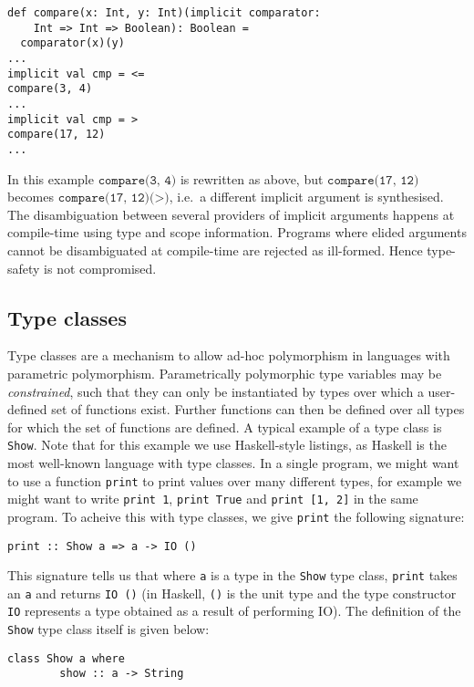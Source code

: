 \begin{minipage}{\linewidth}
\begin{lstlisting}[mathescape]
def compare(x: Int, y: Int)(implicit comparator:
    Int => Int => Boolean): Boolean =
  comparator(x)(y)
...
implicit val cmp = <=
compare(3, 4)
...
implicit val cmp = >
compare(17, 12)
...
\end{lstlisting}
\end{minipage}

\noindent In this example $\texttt{compare(3, 4)}$ is rewritten as above, but
$\texttt{compare(17, 12)}$ becomes $\texttt{compare(17, 12)(>)}$, i.e.~a
different implicit argument is synthesised. The disambiguation between several
providers of implicit arguments happens at compile-time using type and scope
information. Programs where elided arguments cannot be disambiguated at
compile-time are rejected as ill-formed. Hence type-safety is not compromised.

\subsection{Type classes}
Type classes \cite{K88, WB89} are a mechanism to allow ad-hoc polymorphism in
languages with parametric polymorphism. Parametrically polymorphic type
variables may be \emph{constrained}, such that they can only be instantiated by
types over which a user-defined set of functions exist. Further functions can
then be defined over all types for which the set of functions are defined. A
typical example of a type class is \texttt{Show}. Note that for this example we
use Haskell-style listings, as Haskell is the most well-known language with type
classes. In a single program, we might want to use a function \texttt{print} to
print values over many different types, for example we might want to write
\texttt{print 1}, \texttt{print True} and \texttt{print [1, 2]} in the same
program. To acheive this with type classes, we give \texttt{print} the following
signature:
\begin{lstlisting}[mathescape]
    print :: Show a => a -> IO ()
\end{lstlisting}

\noindent This signature tells us that where \texttt{a} is a type in the
\texttt{Show} type class, \texttt{print} takes an \texttt{a} and returns
\texttt{IO ()} (in Haskell, \texttt{()} is the unit type and the type
constructor \texttt{IO} represents a type obtained as a result of performing
IO). The definition of the \texttt{Show} type class itself is given below:
\begin{lstlisting}[mathescape]
    class Show a where
        show :: a -> String
\end{lstlisting}

